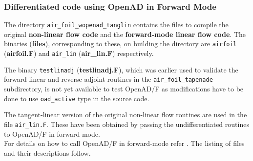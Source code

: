 \clearpage
\subsubsection{Differentiated code using OpenAD in Forward Mode}
\noindent The directory \texttt{air\_foil\_wopenad\_tanglin} contains the files to compile the original \textbf{non-linear flow code} and the \textbf{forward-mode linear flow code}. The binaries (\textbf{files}), corresponding to these, on building the directory are \texttt{airfoil} (\textbf{{airfoil.F}}) and \texttt{air\_lin} (\textbf{{air\_lin.F}}) respectively. \\

\begin{TodoPar}\noindent The binary \texttt{testlinadj} (\textbf{{testlinadj.F}}), which was earlier used to validate the forward-linear and reverse-adjoint routines in the \texttt{air\_foil\_tapenade} subdirectory, is not yet available to test OpenAD/F as modifications have to be done to use \texttt{oad\_active} type in the source code.\end{TodoPar}

\noindent The tangent-linear version of the original non-linear flow routines are used in the file  \texttt{air\_lin.F}. These have been obtained by passing the undifferentiated routines to OpenAD/F in forward mode.\\

\noindent For details on how to call OpenAD/F in forward-mode refer \cite{Utke_2014}. The listing of files and their descriptions follow.\\

\clearpage
